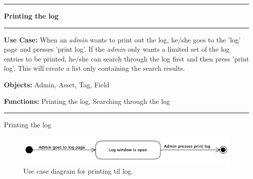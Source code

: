 \begin{use_case}[H]
    \hrule
    \vskip 0.3cm
    \Large
    \begin{center}
    
        \textbf{Printing the log}
        
    \end{center}
    \vskip 0.1cm
    \hrule
    \vskip 0.2cm
    \normalsize
    
    \textbf{Use Case:} When an \textit{admin} wants to print out the log, he/she goes to the 'log' page and presses 'print log'. If the \textit{admin} only wants a limited set of the log entries to be printed, he/she can search through the log first and then press 'print log'. This will create a list only containing the search results.
    
    \vskip 0.2cm
    
    \textbf{Objects:} Admin, Asset, Tag, Field
    
    \vskip 0.2cm
    
    \textbf{Functions:} Printing the log, Searching through the log
    
    \vskip 0.4cm
    \hrule
    \vskip 0.2cm
    \caption{Printing the log} \label{use_case:printing_the_log}
\end{use_case}

\begin{figure}[H]
    \centering
    \includegraphics[width=1.0\textwidth]{figures/PrintLog.png}
    \caption{Use case diagram for printing til log.}
    \label{fig:UseCasePrintLog}
\end{figure}